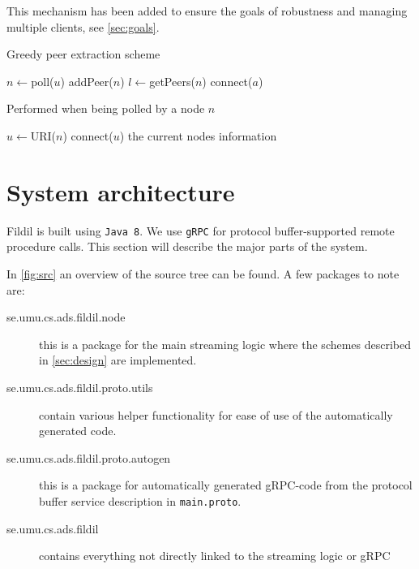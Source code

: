 \documentclass[10pt, a4paper]{article}
\begin{document}
This mechanism has been added to ensure the goals of robustness and
managing multiple clients, see \autoref{sec:goals}.

\begin{algorithm}
  \caption{Greedy peer extraction scheme}
  \label{alg:peerextract}
  \begin{algorithmic}[1]
    \State $n \gets$poll($u$)
    \State addPeer($n$)
    \State $l \gets$getPeers($n$)
    \State connect($a$)
    \EndIf
    \EndFor
    \Else
    \State \Return
    \EndIf
    \EndProcedure
  \end{algorithmic}
\end{algorithm}

\begin{algorithm}
  \caption{Performed when being polled by a node $n$}
  \label{alg:onpoll}
  \begin{algorithmic}[1]
    \State $u\gets$URI($n$)
    \State connect($u$)
    \EndIf
    \State \Return the current nodes information
    \EndProcedure
  \end{algorithmic}
\end{algorithm}

\FloatBarrier

\section{System architecture}
\label{sec:system}

Fildil is built using \texttt{Java 8}. We use \texttt{gRPC} for protocol
buffer-supported remote procedure calls. This section will describe the major
parts of the system.

In \autoref{fig:src} an overview of the source tree can be found. A few packages
to note are:

\begin{description}
\item[se.umu.cs.ads.fildil.node] this is a package for the main streaming logic
  where the schemes described in \autoref{sec:design} are implemented.
\item[se.umu.cs.ads.fildil.proto.utils] contain various helper functionality for
  ease of use of the automatically generated code.
\item[se.umu.cs.ads.fildil.proto.autogen] this is a package for automatically
  generated gRPC-code from the protocol buffer service description in
  \texttt{main.proto}.
\item[se.umu.cs.ads.fildil] contains everything not directly linked to the
  streaming logic or gRPC
\end{description}
\end{document}
